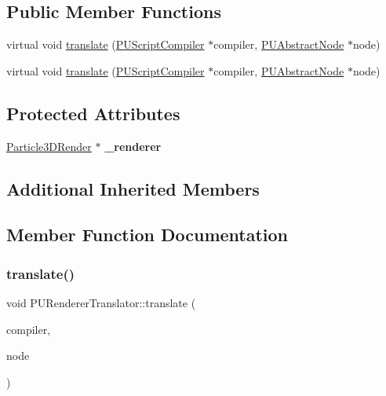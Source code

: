 \subsection*{Public Member Functions}
\begin{DoxyCompactItemize}
\item 
virtual void \hyperlink{classPURendererTranslator_a1cc38145c49682b34108ad7844b2cf29}{translate} (\hyperlink{classPUScriptCompiler}{P\+U\+Script\+Compiler} $\ast$compiler, \hyperlink{classPUAbstractNode}{P\+U\+Abstract\+Node} $\ast$node)
\item 
virtual void \hyperlink{classPURendererTranslator_a05760de688c368e267b7f122a901b273}{translate} (\hyperlink{classPUScriptCompiler}{P\+U\+Script\+Compiler} $\ast$compiler, \hyperlink{classPUAbstractNode}{P\+U\+Abstract\+Node} $\ast$node)
\end{DoxyCompactItemize}
\subsection*{Protected Attributes}
\begin{DoxyCompactItemize}
\item 
\mbox{\label{classPURendererTranslator_a2576c00686ecf185be4b15915a3f97a5}} 
\hyperlink{classParticle3DRender}{Particle3\+D\+Render} $\ast$ {\bfseries \+\_\+renderer}
\end{DoxyCompactItemize}
\subsection*{Additional Inherited Members}


\subsection{Member Function Documentation}
\mbox{\label{classPURendererTranslator_a1cc38145c49682b34108ad7844b2cf29}} 
\subsubsection{\texorpdfstring{translate()}{translate()}\hspace{0.1cm}{\footnotesize\ttfamily [1/2]}}
{\footnotesize\ttfamily void P\+U\+Renderer\+Translator\+::translate (\begin{DoxyParamCaption}\item[{\hyperlink{classPUScriptCompiler}{P\+U\+Script\+Compiler} $\ast$}]{compiler,  }\item[{\hyperlink{classPUAbstractNode}{P\+U\+Abstract\+Node} $\ast$}]{node }\end{DoxyParamCaption})\hspace{0.3cm}{\ttfamily [virtual]}}

